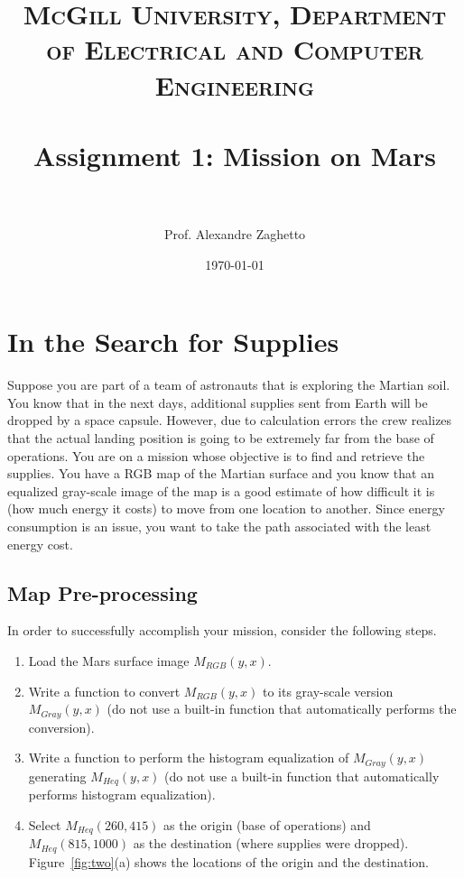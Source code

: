\documentclass[paper=a4, fontsize=11pt]{scrartcl} %
\title{	
\normalfont \normalsize 
\textsc{McGill University, Department of Electrical and Computer Engineering} \\ [25pt] %
\horrule{0.5pt} \\[0.4cm] %
\huge Assignment 1: Mission on Mars \\ %
\horrule{2pt} \\[0.5cm] %
}
\author{Prof. Alexandre Zaghetto} %
\date{\normalsize\today} %
\numberwithin{equation}{section} %
\numberwithin{figure}{section} %
\numberwithin{table}{section} %
\begin{document}
\maketitle %


\section{In the Search for Supplies}

Suppose you are part of a team of astronauts that is exploring the Martian soil. You know that in the next days, additional supplies sent from Earth will be dropped by a space capsule. However, due to calculation errors the crew realizes that the actual landing position is going to be extremely far from the base of operations. You are on a mission whose objective is to find and retrieve the supplies. You have a RGB map of the Martian surface and you know that an equalized gray-scale image of the map is a good estimate of how difficult it is (how much energy it costs) to move from one location to another. Since energy consumption is an issue, you want to take the path associated with the least energy cost.

\subsection{Map Pre-processing}
In order to successfully accomplish your mission, consider the following steps.

\begin{enumerate}
	\item  Load the Mars surface image $M_{RGB}(y, x)$.
	\item  Write a function to convert $M_{RGB}(y, x)$ to its gray-scale version $M_{Gray}(y, x)$ (do not use a built-in function that automatically performs the conversion).
	\item  Write a function to perform the histogram equalization of $M_{Gray}(y, x)$ generating $M_{Heq}(y, x)$  (do not use a built-in function that automatically performs histogram equalization).
	\item  Select $M_{Heq}(260, 415)$ as the origin (base of operations) and $M_{Heq}(815, 1000)$ as the destination (where supplies were dropped). Figure~\ref{fig:two}(a) shows the locations of the origin and the destination. 
\end{enumerate}
\end{document}
